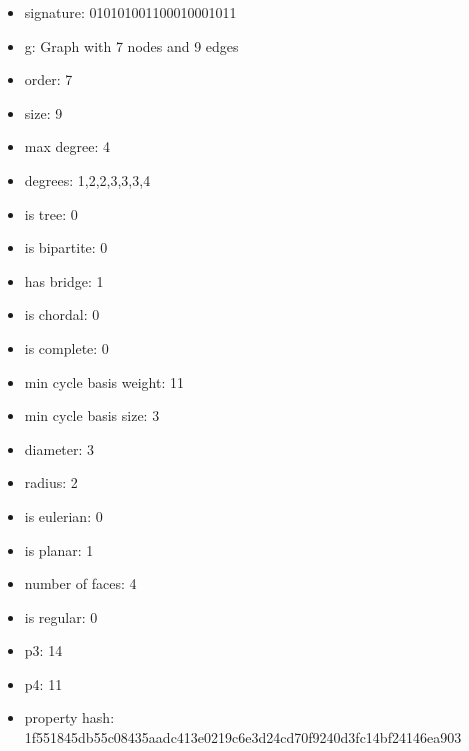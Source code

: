 \begin{itemize}
\item signature: 010101001100010001011
\item g: Graph with 7 nodes and 9 edges
\item order: 7
\item size: 9
\item max degree: 4
\item degrees: 1,2,2,3,3,3,4
\item is tree: 0
\item is bipartite: 0
\item has bridge: 1
\item is chordal: 0
\item is complete: 0
\item min cycle basis weight: 11
\item min cycle basis size: 3
\item diameter: 3
\item radius: 2
\item is eulerian: 0
\item is planar: 1
\item number of faces: 4
\item is regular: 0
\item p3: 14
\item p4: 11
\item property hash: 1f551845db55c08435aadc413e0219c6e3d24cd70f9240d3fc14bf24146ea903
\end{itemize}
\newpage
\begin{figure}
\end{figure}
